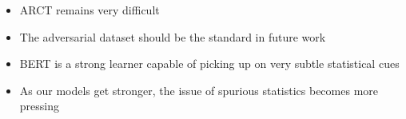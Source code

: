 \documentclass[a0,portrait]{a0poster}
\begin{document}
\begin{multicols}{2}
\vspace{8pt}

\begin{itemize}
    \item ARCT remains very difficult
    \item The adversarial dataset should be the standard in future work
    \item BERT is a strong learner capable of picking up on very subtle statistical cues
    \item As our models get stronger, the issue of spurious statistics becomes more pressing
\end{itemize}

\end{multicols}
\end{document}
